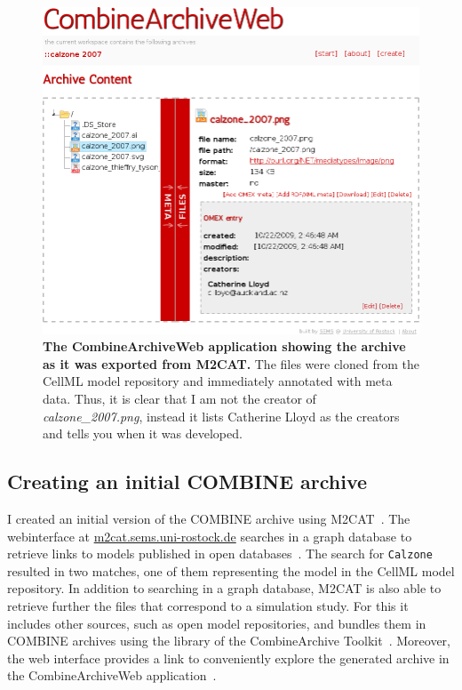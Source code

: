 \begin{figure}
\begin{center}
\includegraphics[width=.8\textwidth]{img/webcat-screenshot-combined.png}
\end{center}
\caption{\textbf{The CombineArchiveWeb application showing the archive as it was exported from M2CAT.} The files were cloned from the CellML model repository and immediately annotated with meta data. Thus, it is clear that I am not the creator of \textit{calzone\_2007.png}, instead it lists Catherine Lloyd as the creators and tells you when it was developed.}
\label{fig:screen:webcat}
\end{figure}

\subsection{Creating an initial COMBINE archive}

I created an initial version of the COMBINE archive using M2CAT~\cite{m2cat}.
The webinterface at \href{http://m2cat.sems.uni-rostock.de/}{m2cat.sems.uni-rostock.de} searches in a graph database to retrieve links to models published in open databases~\cite{masymos}.
The search for \texttt{Calzone} resulted in two matches, one of them representing the model in the CellML model repository.
In addition to searching in a graph database, M2CAT is also able to retrieve further the files that correspond to a simulation study.
For this it includes other sources, such as open model repositories, and bundles them in COMBINE archives using the library of the CombineArchive Toolkit~\cite{cat}.
Moreover, the web interface provides a link to conveniently explore the generated archive in the CombineArchiveWeb application~\cite{scharm2014}.

